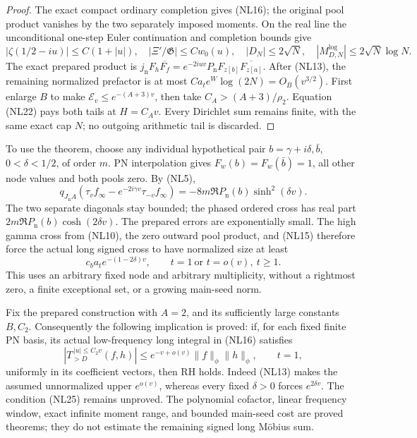 \documentclass[11pt]{article}
\theoremstyle{remark}\newtheorem{remark}[theorem]{Remark}
\begin{document}
\begin{proof}
The exact compact ordinary completion gives (NL16); the original
pool product vanishes by the two separately imposed moments.
On the real line the unconditional one-step Euler continuation
and completion bounds give
\[
 |\zeta(1/2-iu)|\le C(1+|u|),\quad
 |\Xi'/\mathfrak G|\le Cw_0(u),\quad
 |D_N|\le2\sqrt N,\quad |M^{\log}_{D,N}|\le2\sqrt N\log N.
\]
The exact prepared product is
\(j_{\mathrm n}F_h\overline{F_f}
 =e^{-2iuv}P_{\mathrm n}F_{z[b]}\overline{F_{z[a]}}\).
After (NL13), the remaining normalized prefactor is at most
\(Ca_te^W\log(2N)=O_B(v^{3/2})\).
First enlarge \(B\) to make \(\mathcal E_v\le e^{-(A+3)v}\),
then take \(C_A>(A+3)/\rho_2\). Equation (NL22) pays both
tails at \(H=C_Av\). Every Dirichlet sum remains finite, with
the same exact cap \(N\); no outgoing arithmetic tail is discarded.
\end{proof}

To use the theorem, choose any individual hypothetical pair
\(b=\gamma+i\delta,\bar b\), \(0<\delta<1/2\), of order \(m\).
PN interpolation gives \(F_w(b)=F_w(\bar b)=1\), all other
node values and both pools zero. By (NL5),
\[
 q_{J_{\mathrm n}A}
   (\tau_vf_\infty-e^{-2i\gamma v}\tau_{-v}f_\infty)
       =-8m\Re P_{\mathrm n}(b)\sinh^2(\delta v).                \tag{NL23}
\]
The two separate diagonals stay bounded; the phased ordered cross
has real part \(2m\Re P_{\mathrm n}(b)\cosh(2\delta v)\).
The prepared errors are exponentially small. The high gamma
cross from (NL10), the zero outward pool product, and (NL15)
therefore force the actual long signed cross to have normalized
size at least
\[
 c_ba_te^{-(1-2\delta)v},\qquad
                 t=1\ \text{or }t=o(v),\ t\ge1.                \tag{NL24}
\]
This uses an arbitrary fixed node and arbitrary multiplicity,
without a rightmost zero, a finite exceptional set, or a
growing main-seed norm.

Fix the prepared construction with \(A=2\), and its sufficiently
large constants \(B,C_2\). Consequently the following implication
is proved: if, for each
fixed finite PN basis, its actual low-frequency long integral
in (NL16) satisfies
\[
 |T_{>D}^{\,|u|\le C_2v}(f,h)|
       \le e^{-v+o(v)}\|f\|_\phi\|h\|_\phi,\qquad t=1,           \tag{NL25}
\]
uniformly in its coefficient vectors, then RH holds.
Indeed (NL13) makes the assumed unnormalized upper \(e^{o(v)}\),
whereas every fixed \(\delta>0\) forces \(e^{2\delta v}\).
The condition (NL25) remains unproved. The polynomial cofactor,
linear frequency window, exact infinite moment range, and bounded
main-seed cost are proved theorems; they do not estimate the
remaining signed long Möbius sum.
\end{document}
